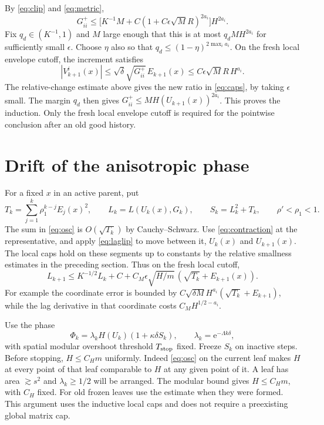 \documentclass[11pt]{article}
\newcommand{\ee}{\mathrm e}
\begin{document}
By \eqref{eq:clip} and \eqref{eq:metric},
\[
 G^+_{ii}\le
 \bigl[K^{-1}M+C(1+C\epsilon\sqrt M R)^{2a_i}\bigr]H^{2a_i}.
\]
Fix \(q_d\in(K^{-1},1)\) and \(M\) large enough that this is at
most \(q_d M H^{2a_i}\) for sufficiently small \(\epsilon\).
Choose \(\eta\) also so that
\(q_d\le (1-\eta)^{2\max_i a_i}\).
On the fresh local envelope cutoff, the increment satisfies
\[
 |V_{k+1}^i(x)|\le \sqrt\delta\sqrt{G^+_{ii}}\,E_{k+1}(x)
 \le C\epsilon\sqrt M R\, H^{a_i}.
\]
The relative-change estimate above gives the new ratio in
\eqref{eq:caps}, by taking \(\epsilon\) small. The margin \(q_d\)
then gives \(G^+_{ii}\le M H(U_{k+1}(x))^{2a_i}\).
This proves the induction. Only the fresh local envelope cutoff
is required for the pointwise conclusion after an old good history.

\section{Drift of the anisotropic phase}

For a fixed \(x\) in an active parent, put
\[
 T_k=\sum_{j=1}^k \rho_1^{k-j} E_j(x)^2,\qquad
 L_k=L(U_k(x),G_k),\qquad S_k=L_k^2+T_k ,
 \qquad \rho'<\rho_1<1 .
\]
The sum in \eqref{eq:osc} is \(O(\sqrt{T_k})\) by Cauchy--Schwarz.
Use \eqref{eq:contraction} at the representative, and apply
\eqref{eq:laglip} to move between it, \(U_k(x)\) and \(U_{k+1}(x)\).
The local caps hold on these segments up to constants by the
relative smallness estimates in the preceding section. Thus on
the fresh local cutoff,
\begin{equation}\label{eq:lag}
 L_{k+1}\le K^{-1/2} L_k+C
       +C_M \epsilon \sqrt{H/m}\,(\sqrt{T_k}+E_{k+1}(x)).
\end{equation}
For example the coordinate error is bounded by
\(C\sqrt{\delta M} H^{a_i}(\sqrt{T_k}+E_{k+1})\), while the
lag derivative in that coordinate costs \(C_M H^{1/2-a_i}\).

Use the phase
\[
 \Phi_k=\lambda_k H(U_k)(1+\kappa\delta S_k),
 \qquad \lambda_k=\ee^{-\Lambda k\delta},
\]
with spatial modular overshoot threshold \(T_{\rm stop}\) fixed.
Freeze \(S_k\) on inactive steps. Before stopping, \(H\le C_H m\)
uniformly. Indeed \eqref{eq:osc} on the current leaf makes \(H\)
at every point of that leaf comparable to \(H\) at any given
point of it. A leaf has area \(\gtrsim s^2\) and \(\lambda_k\ge1/2\)
will be arranged. The modular bound gives \(H\le C_H m\), with
\(C_H\) fixed. For old frozen leaves use the estimate when they
were formed. This argument uses the inductive local caps and
does not require a preexisting global matrix cap.
\end{document}
